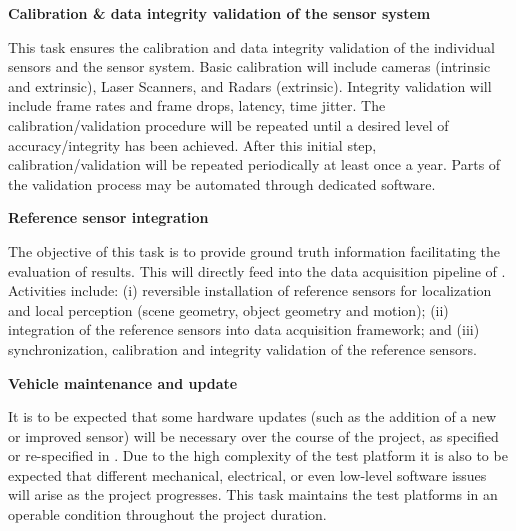 {\begin{tasks}{\WPVehicleNo}
\item  {\bf Calibration \& data integrity validation of the sensor system}
  \taskpartners{\ETHZ}{\PRAGUE, \VW}

This task ensures the calibration and data integrity validation of the individual sensors and the sensor system. Basic calibration will include cameras (intrinsic and extrinsic), Laser Scanners,  and Radars (extrinsic). Integrity validation will include frame rates and frame drops, latency, time jitter. The calibration/validation procedure will be repeated until a desired level of accuracy/integrity has been achieved. After this initial step, calibration/validation will be repeated periodically at least once a year. Parts of the validation process may be automated through dedicated software.



\item  {\bf Reference sensor integration}
  \taskpartner{\VW}

The objective of this task is to provide ground truth information facilitating the evaluation of results. This will directly feed into the data acquisition pipeline of \WPIntegration. Activities include: (i) reversible installation of reference sensors for localization and local perception (scene geometry, object geometry and motion); (ii) integration of the reference sensors into data acquisition framework; and (iii) synchronization, calibration and integrity validation of the reference sensors.

\item  {\bf Vehicle maintenance and update}
  \taskpartner{\VW}

It is to be expected that some hardware updates (such as the addition of a new or improved sensor) will be necessary over the course of the project, as specified or re-specified in \WPSpecification. Due to the high complexity of the test platform it is also to be expected that different mechanical, electrical, or even low-level software issues will arise as the project progresses. This task maintains the test platforms in an operable condition throughout the project duration.


\end{tasks}}
